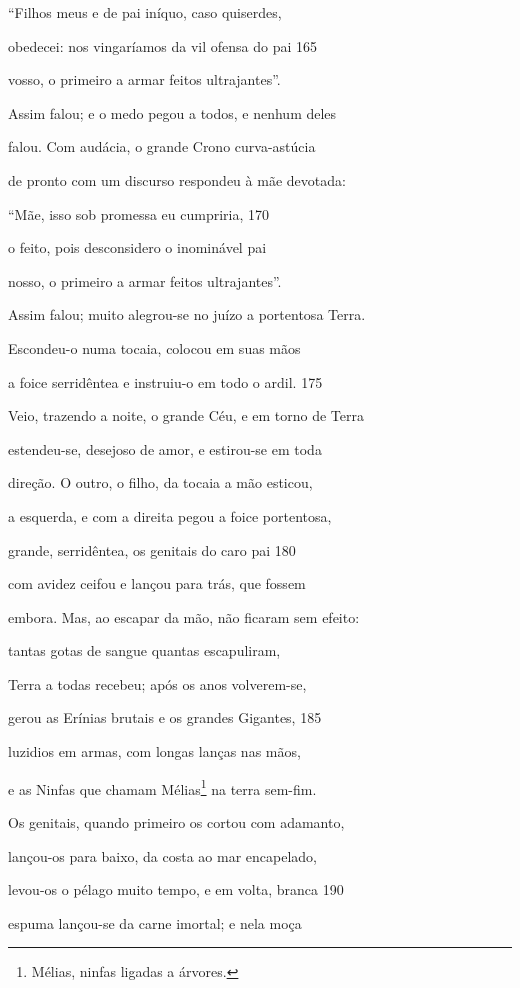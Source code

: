 ``Filhos meus e de pai iníquo, caso quiserdes,

obedecei: nos vingaríamos da vil ofensa do pai \num{165}

vosso, o primeiro a armar feitos ultrajantes''.

\quad{}Assim falou; e o medo pegou a todos, e nenhum deles

falou. Com audácia, o grande Crono curva-astúcia

de pronto com um discurso respondeu à mãe devotada:

``Mãe, isso sob promessa eu cumpriria, \num{170}

o feito, pois desconsidero o inominável pai

nosso, o primeiro a armar feitos ultrajantes''.

\quad{}Assim falou; muito alegrou-se no juízo a portentosa \qb{}Terra.

Escondeu-o numa tocaia, colocou em suas mãos

a foice serridêntea e instruiu-o em todo o ardil. \num{175}

Veio, trazendo a noite, o grande Céu, e em torno de Terra

estendeu-se, desejoso de amor, e estirou-se em toda

direção. O outro, o filho, da tocaia a mão esticou,

a esquerda, e com a direita pegou a foice portentosa,

grande, serridêntea, os genitais do caro pai \num{180}

com avidez ceifou e lançou para trás, que fossem

embora. Mas, ao escapar da mão, não ficaram sem efeito:

tantas gotas de sangue quantas escapuliram,

Terra a todas recebeu; após os anos volverem-se,

gerou as Erínias brutais e os grandes Gigantes, \num{185}

luzidios em armas, com longas lanças nas mãos,

e as Ninfas que chamam Mélias\footnote{Mélias, ninfas ligadas a árvores.} na terra sem-fim.

Os genitais, quando primeiro os cortou com adamanto,

lançou-os para baixo, da costa ao mar encapelado,

levou-os o pélago muito tempo, e em volta, branca \num{190}

espuma lançou-se da carne imortal; e nela moça

